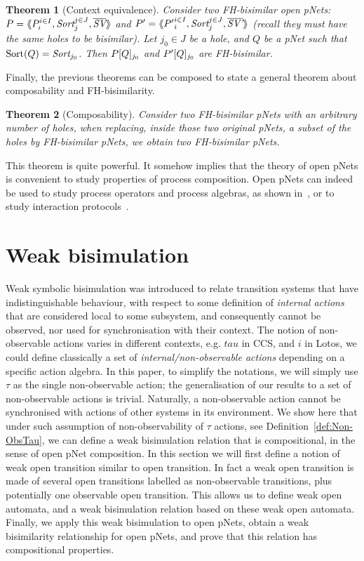 \documentclass{lmcs}
\newtheorem{theorem}{Theorem}
\begin{document}
 
\begin{theorem}[Context equivalence]\label{thm-ctxt-eq}
	Consider two FH-bisimilar open pNets:
	$\pNet = \mylangle \pNet_i^{i\in I}, \Sort_j^{j\in J}, 
	\set{\symb{SV}}\myrangle$ and 	$\pNet' = \mylangle {\pNet'}_i^{i\in I}, 
	\Sort_j^{j\in 
	J}, 	\set{\symb{SV'}}\myrangle$ 
	(recall they must have the same holes to be bisimilar).
	Let $j_0\in J$ be a hole, and $Q$ be a pNet such that $\Sortop(Q)=\Sort_{j_0}$. Then 
	$P[Q]_{j_0}$ and 
	$P'[Q]_{j_0}$ are FH-bisimilar.
\end{theorem}

Finally, the previous theorems can be composed to state a general theorem about 
composability and FH-bisimilarity.
\begin{theorem}[Composability] \label{thm-composability}
	Consider two FH-bisimilar pNets with an arbitrary number of holes, when replacing, 
	inside those two original pNets, a subset of the holes by FH-bisimilar pNets, we 
	obtain two FH-bisimilar pNets.
\end{theorem}
This theorem is quite powerful. It somehow implies that the theory of open pNets is convenient to study properties of process composition. Open pNets can indeed be used to study process operators and process algebras, as shown in~\cite{henrio:Forte2016}, or to study interaction protocols~\cite{BHHM:FACS11}.

\section{Weak bisimulation}\label{sec:weak}

Weak symbolic bisimulation was introduced to relate transition systems
that have indistinguishable behaviour, with respect to some definition
of \emph{internal actions} that are considered local to some
subsystem, and consequently cannot be observed, nor used for
synchronisation with their context.
The notion of non-observable actions varies in different contexts,
e.g. $tau$ in CCS, and $i$ in Lotos, we could define classically a set of
\emph{internal/non-observable actions} depending on a specific action
algebra. In this paper, to simplify the notations, we will simply use $\tau$ as the single non-observable action; the generalisation of our results to a set of non-observable actions is trivial. 
Naturally, a non-observable action cannot be synchronised with
actions of other systems in its environment. 
We show here that under such assumption of non-observability of $\tau$ actions, see Definition~\ref{def:Non-ObsTau}, we can define a weak bisimulation relation that is compositional, in the sense of open pNet composition. In this section we will first define a notion of weak open transition similar to open transition. In fact a weak open transition is made of several open transitions labelled as non-observable transitions, plus potentially one observable open transition. This allows us to define weak open automata, and a weak bisimulation relation based on these weak open automata. Finally, we apply this weak bisimulation to open pNets, obtain a weak bisimilarity relationship for open pNets, and prove that this relation has compositional properties.
\end{document}
